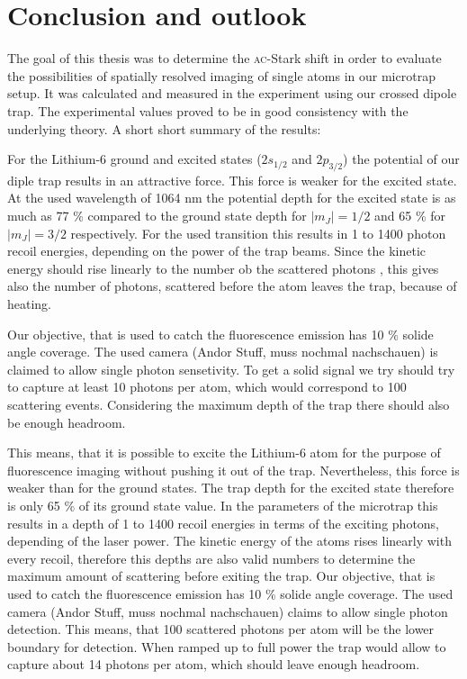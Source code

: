 \chapter{Conclusion and outlook}

The goal of this thesis was to determine the \textsc{ac}-Stark shift in order to evaluate the possibilities of spatially resolved imaging of single atoms in our microtrap setup. It was calculated and measured in the experiment using our crossed dipole trap. The experimental values proved to be in good consistency with the underlying theory. A short short summary of the results:

For the Lithium-6 ground and excited states ($2s_{1/2}$ and $2p_{3/2}$) the potential of our diple trap results in an attractive force. This force is weaker for the excited state. At the used wavelength of 1064 nm the potential depth for the excited state is as much as 77 \% compared to the ground state depth for $|m_J|=1/2$ and 65 \% for $|m_J|=3/2$ respectively. For the used transition this results in 1 to 1400 photon recoil energies, depending on the power of the trap beams. Since the kinetic energy should rise linearly to the number ob the scattered photons \cite{guck das nach Jonathan!}, this gives also the number of photons, scattered before the atom leaves the trap, because of heating. 

Our objective, that is used to catch the fluorescence emission has 10 \% solide angle coverage. The used camera (Andor Stuff, muss nochmal nachschauen) is claimed to allow single photon sensetivity. To get a solid signal we try should try to capture at least 10 photons per atom, which would correspond to 100 scattering events. Considering the maximum depth of the trap there should also be enough headroom.

This means, that it is possible to excite the Lithium-6 atom for the purpose of fluorescence imaging without pushing it out of the trap. Nevertheless, this force is weaker than for the ground states. The trap depth for the excited state therefore is only 65 \% of its ground state value. In the parameters of the microtrap this results in a depth of 1 to 1400 recoil energies in terms of the exciting photons, depending of the laser power. The kinetic energy of the atoms rises linearly \cite{schau nochmal nach Jonathan!} with every recoil, therefore this depths are also valid numbers to determine the maximum amount of scattering before exiting the trap. Our objective, that is used to catch the fluorescence emission has 10 \% solide angle coverage. The used camera (Andor Stuff, muss nochmal nachschauen) claims to allow single photon detection. This means, that 100 scattered photons per atom will be the lower boundary for detection. When ramped up to full power the trap would allow to capture about 14 photons per atom, which should leave enough headroom.




